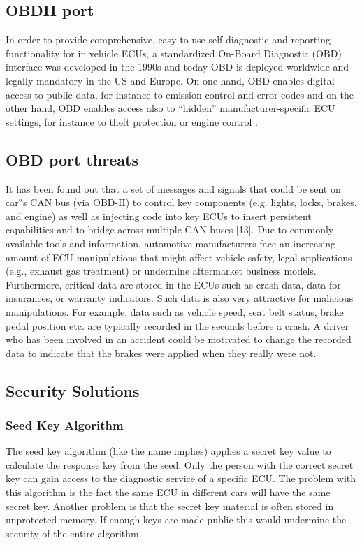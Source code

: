 \documentclass[11pt]{article}
\begin{document}
\subsection{OBDII port}

In order to provide comprehensive, easy-to-use self diagnostic and reporting functionality for in vehicle ECUs, a standardized On-Board Diagnostic (OBD) interface was developed in the 1990s and today OBD is deployed worldwide and legally mandatory in the US and Europe. \cite{Yadav16} On one hand, OBD enables digital access to public data, for instance to emission control and error codes and on the other hand, OBD enables access also to “hidden” manufacturer-specific ECU settings, for instance to theft protection or engine control \cite{Yadav16}.

\subsection{OBD port threats}
It has been found out that a set of messages and signals that could be sent on car‟s CAN bus (via OBD-II) to control key components (e.g. lights, locks, brakes, and engine) as well as injecting code into key ECUs to insert persistent capabilities and to bridge across multiple CAN buses [13]. Due to commonly available tools and information, automotive manufacturers face an increasing amount of ECU manipulations that might affect vehicle safety, legal applications (e.g., exhaust gas treatment) or undermine aftermarket business models. Furthermore, critical data are stored in the ECUs such as crash data, data for insurances, or warranty indicators. Such data is also very attractive for malicious manipulations. For example, data such as vehicle speed, seat belt status, brake pedal position etc. are typically recorded in the seconds before a crash. A driver who has been involved in an accident could be motivated to change the recorded data to indicate that the brakes were applied when they really were not.


\subsection{Security Solutions}

\subsubsection{Seed Key Algorithm}

The seed key algorithm (like the name implies) applies a secret key value to calculate the response key from the seed. Only the person with the correct secret key can gain access to the diagnostic service of a specific ECU. The problem with this algorithm is the fact the same ECU in different cars will have the same secret key. Another problem is that the secret key material is often stored in unprotected memory. If enough keys are made public this would undermine the security of the entire algorithm.  
\end{document}
